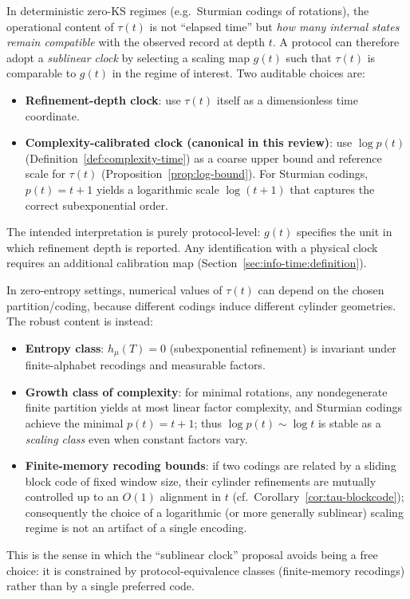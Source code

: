 \begin{remark}\label{rem:sublinear-clock}
In deterministic zero-KS regimes (e.g.\ Sturmian codings of rotations), the operational content of $\tau(t)$ is not ``elapsed time'' but \emph{how many internal states remain compatible} with the observed record at depth $t$. A protocol can therefore adopt a \emph{sublinear clock} by selecting a scaling map $g(t)$ such that $\tau(t)$ is comparable to $g(t)$ in the regime of interest. Two auditable choices are:
\begin{itemize}[leftmargin=*,itemsep=2pt]
  \item \textbf{Refinement-depth clock}: use $\tau(t)$ itself as a dimensionless time coordinate.
  \item \textbf{Complexity-calibrated clock (canonical in this review)}: use $\log p(t)$ (Definition~\ref{def:complexity-time}) as a coarse upper bound and reference scale for $\tau(t)$ (Proposition~\ref{prop:log-bound}). For Sturmian codings, $p(t)=t+1$ yields a logarithmic scale $\log(t+1)$ that captures the correct subexponential order.
\end{itemize}
The intended interpretation is purely protocol-level: $g(t)$ specifies the unit in which refinement depth is reported. Any identification with a physical clock requires an additional calibration map (Section~\ref{sec:info-time:definition}).
\end{remark}

\begin{remark}\label{rem:coding-dependence-zero}
In zero-entropy settings, numerical values of $\tau(t)$ can depend on the chosen partition/coding, because different codings induce different cylinder geometries. The robust content is instead:
\begin{itemize}[leftmargin=*,itemsep=2pt]
  \item \textbf{Entropy class}: $h_\mu(T)=0$ (subexponential refinement) is invariant under finite-alphabet recodings and measurable factors.
  \item \textbf{Growth class of complexity}: for minimal rotations, any nondegenerate finite partition yields at most linear factor complexity, and Sturmian codings achieve the minimal $p(t)=t+1$; thus $\log p(t)\sim \log t$ is stable as a \emph{scaling class} even when constant factors vary.
  \item \textbf{Finite-memory recoding bounds}: if two codings are related by a sliding block code of fixed window size, their cylinder refinements are mutually controlled up to an $O(1)$ alignment in $t$ (cf.\ Corollary~\ref{cor:tau-blockcode}); consequently the choice of a logarithmic (or more generally sublinear) scaling regime is not an artifact of a single encoding.
\end{itemize}
This is the sense in which the ``sublinear clock'' proposal avoids being a free choice: it is constrained by protocol-equivalence classes (finite-memory recodings) rather than by a single preferred code.
\end{remark}

